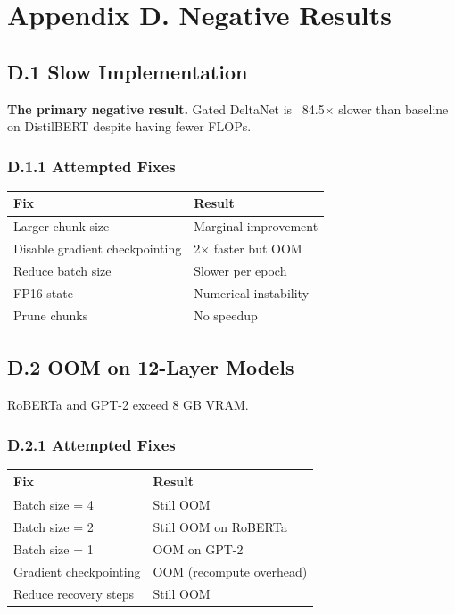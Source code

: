 
\section{Appendix D. Negative Results}

\subsection{D.1 Slow Implementation}

\textbf{The primary negative result.} Gated DeltaNet is ~84.5$\times$ slower 
than baseline on DistilBERT despite having fewer FLOPs.

\subsubsection{D.1.1 Attempted Fixes}

\begin{table}[H]
\centering
\small
\begin{tabular}{ll}
\toprule
\textbf{Fix} & \textbf{Result} \\
\midrule
Larger chunk size & Marginal improvement \\
Disable gradient checkpointing & 2$\times$ faster but OOM \\
Reduce batch size & Slower per epoch \\
FP16 state & Numerical instability \\
Prune chunks & No speedup \\
\bottomrule
\end{tabular}
\end{table}

\subsection{D.2 OOM on 12-Layer Models}

RoBERTa and GPT-2 exceed 8 GB VRAM.

\subsubsection{D.2.1 Attempted Fixes}

\begin{table}[H]
\centering
\small
\begin{tabular}{ll}
\toprule
\textbf{Fix} & \textbf{Result} \\
\midrule
Batch size = 4 & Still OOM \\
Batch size = 2 & Still OOM on RoBERTa \\
Batch size = 1 & OOM on GPT-2 \\
Gradient checkpointing & OOM (recompute overhead) \\
Reduce recovery steps & Still OOM \\
\bottomrule
\end{tabular}
\end{table}

